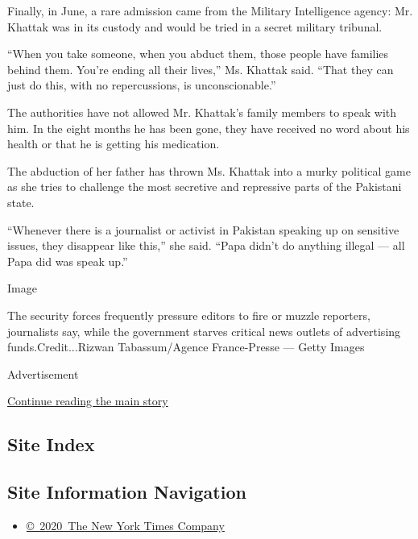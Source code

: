 Finally, in June, a rare admission came from the Military Intelligence
agency: Mr. Khattak was in its custody and would be tried in a secret
military tribunal.

``When you take someone, when you abduct them, those people have
families behind them. You're ending all their lives,'' Ms. Khattak said.
``That they can just do this, with no repercussions, is
unconscionable.''

The authorities have not allowed Mr. Khattak's family members to speak
with him. In the eight months he has been gone, they have received no
word about his health or that he is getting his medication.

The abduction of her father has thrown Ms. Khattak into a murky
political game as she tries to challenge the most secretive and
repressive parts of the Pakistani state.

``Whenever there is a journalist or activist in Pakistan speaking up on
sensitive issues, they disappear like this,'' she said. ``Papa didn't do
anything illegal --- all Papa did was speak up.''

Image

The security forces frequently pressure editors to fire or muzzle
reporters, journalists say, while the government starves critical news
outlets of advertising funds.Credit...Rizwan Tabassum/Agence
France-Presse --- Getty Images

Advertisement

\protect\hyperlink{after-bottom}{Continue reading the main story}

\hypertarget{site-index}{%
\subsection{Site Index}\label{site-index}}

\hypertarget{site-information-navigation}{%
\subsection{Site Information
Navigation}\label{site-information-navigation}}

\begin{itemize}
\tightlist
\item
  \href{https://help.nytimes.com/hc/en-us/articles/115014792127-Copyright-notice}{©~2020~The
  New York Times Company}
\end{itemize}

